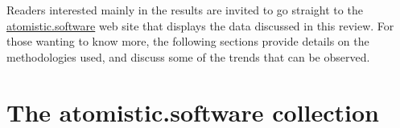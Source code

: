 \documentclass[9pt,review]{livecoms}
\begin{document}

Readers interested mainly in the results are invited to go straight to the \href{atomistic.software}{atomistic.software} web site that displays the data discussed in this review.
For those wanting to know more, the following sections provide details on the methodologies used, and discuss some of the trends that can be observed.



\section{The atomistic.software collection}

\end{document}
